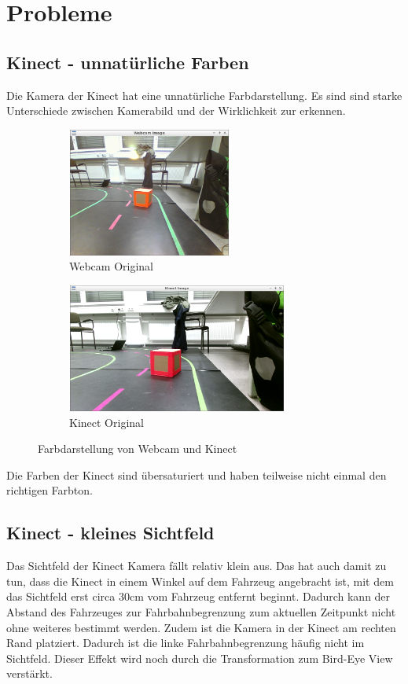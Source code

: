 \chapter{Probleme}
\label{cha:Probleme}

\section{Kinect - unnatürliche Farben}
\label{sec:farben}
Die Kamera der Kinect hat eine unnatürliche Farbdarstellung.
Es sind sind starke Unterschiede zwischen Kamerabild und der Wirklichkeit zur erkennen.

\begin{figure}[ht]
	\centering
	\begin{subfigure}{220px}
		\centering
		\includegraphics[width=204px, height=160px]{images/Webcam_RAW.png}
		\caption{Webcam Original}
	\end{subfigure}
	\begin{subfigure}{270px}
		\centering
		\includegraphics[width=274px, height=160px]{images/Kinect_qHD_RAW.png}
		\caption{Kinect Original}
	\end{subfigure}
	\caption{Farbdarstellung von Webcam und Kinect}
\end{figure}

Die Farben der Kinect sind übersaturiert und haben teilweise nicht einmal den richtigen Farbton.

\section{Kinect - kleines Sichtfeld}
\label{sec:sichtfeld}
Das Sichtfeld der Kinect Kamera fällt relativ klein aus.
Das hat auch damit zu tun, dass die Kinect in einem Winkel auf dem Fahrzeug angebracht ist, mit dem das Sichtfeld erst circa 30cm vom Fahrzeug entfernt beginnt.
Dadurch kann der Abstand des Fahrzeuges zur Fahrbahnbegrenzung zum aktuellen Zeitpunkt nicht ohne weiteres bestimmt werden. 
Zudem ist die Kamera in der Kinect am rechten Rand platziert.
Dadurch ist die linke Fahrbahnbegrenzung häufig nicht im Sichtfeld.
Dieser Effekt wird noch durch die Transformation zum Bird-Eye View verstärkt.

